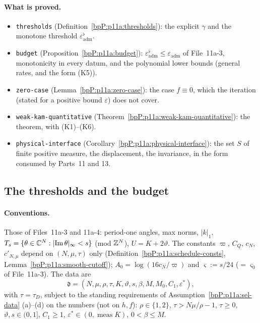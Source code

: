 \paragraph{What is proved.}
\begin{itemize}
\item \texttt{thresholds} (Definition~\ref{bpP:p11a:thresholds}): the explicit $\gamma$ and the monotone threshold $\varepsilon_{\mathrm{adm}}^\flat$.
\item \texttt{budget} (Proposition~\ref{bpP:p11a:budget}): $\varepsilon^\flat_{\mathrm{adm}}\le\varepsilon_{\mathrm{adm}}$ of File~11a-3, monotonicity in every datum, and the polynomial lower bounds (general rates, and the form (K5)).
\item \texttt{zero-case} (Lemma~\ref{bpP:p11a:zero-case}): the case $f\equiv0$, which the iteration (stated for a positive bound $\varepsilon$) does not cover.
\item \texttt{weak-kam-quantitative} (Theorem~\ref{bpP:p11a:weak-kam-quantitative}): the theorem, with (K1)--(K6).
\item \texttt{physical-interface} (Corollary~\ref{bpP:p11a:physical-interface}): the set $S$ of finite positive measure, the displacement, the invariance, in the form consumed by Parts~11 and 13.
\end{itemize}

\subsection{The thresholds and the budget}\label{bpP:p11a:sec-q-budget}

\paragraph{Conventions.} Those of Files~11a-3 and 11a-4: period-one angles, max norms, $\lvert k\rvert_1$, $T_s=\{\theta\in\mathbb{C}^N:\lvert\operatorname{Im}\theta\rvert_\infty<s\}$ (mod $\mathbb{Z}^N$), $U=K+2\vartheta$. The constants $\varpi$, $C_Q$, $c_N$, $c'_{N,\mu}$ depend on $(N,\mu,\tau)$ only (Definition~\ref{bpP:p11a:schedule-consts}, Lemma~\ref{bpP:p11a:smooth-cutoff}); $A_0=\log(16c_N/\varpi)$ and $\varsigma:=s/24$ ($=\varsigma_0$ of File~11a-3). The data are
\[\mathfrak d=(N,\mu,\rho,\tau,K,\vartheta,s,\beta,M,M_0,C_1,\varepsilon^*),\]
with $\tau=\tau_D$, subject to the standing requirements of Assumption~\ref{bpP:p11a:sel-data} (a)--(d) on the numbers (not on $h,f$): $\rho\in\{1,2\}$, $\tau>N\mu/\rho-1$, $\tau\ge0$, $\vartheta,s\in(0,1]$, $C_1\ge1$, $\varepsilon^*\in(0,\operatorname{meas}K)$, $0<\beta\le M$.

